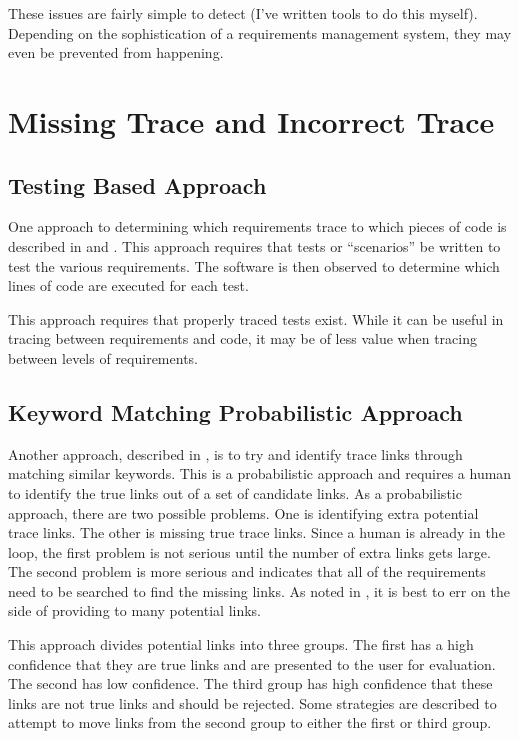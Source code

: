 \documentclass[10pt, openany]{report}
\begin{document}
These issues are fairly simple to detect (I've written tools to do this myself).  Depending on the sophistication of a requirements management system, they may even be prevented from happening.

\section{Missing Trace and Incorrect Trace}
\subsection{Testing Based Approach}
One approach to determining which requirements trace to which pieces of code is described in \cite{req4} and \cite{req9}.  This approach requires that tests or ``scenarios'' be written to test the various requirements.  The software is then observed to determine which lines of code are executed for each test.

This approach requires that properly traced tests exist.  While it can be useful in tracing between requirements and code, it may be of less value when tracing between levels of requirements.

\subsection{Keyword Matching Probabilistic Approach}
Another approach, described in \cite{req6}, is to try and identify trace links through matching similar keywords.  This is a probabilistic approach and requires a human to identify the true links out of a set of candidate links.  As a probabilistic approach, there are two possible problems.  One is identifying extra potential trace links.  The other is missing true trace links.  Since a human is already in the loop, the first problem is not serious until the number of extra links gets large.  The second problem is more serious and indicates that all of the requirements need to be searched to find the missing links.  As noted in \cite{req6}, it is best to err on the side of providing to many potential links.

This approach divides potential links into three groups.  The first has a high confidence that they are true links and are presented to the user for evaluation.  The second has low confidence.  The third group has high confidence that these links are not true links and should be rejected.  Some strategies are described to attempt to move links from the second group to either the first or third group.
\end{document}
